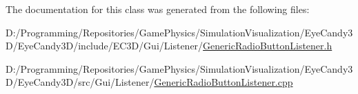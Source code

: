 The documentation for this class was generated from the following files\+:\begin{DoxyCompactItemize}
\item 
D\+:/\+Programming/\+Repositories/\+Game\+Physics/\+Simulation\+Visualization/\+Eye\+Candy3\+D/\+Eye\+Candy3\+D/include/\+E\+C3\+D/\+Gui/\+Listener/\mbox{\hyperlink{_generic_radio_button_listener_8h}{Generic\+Radio\+Button\+Listener.\+h}}\item 
D\+:/\+Programming/\+Repositories/\+Game\+Physics/\+Simulation\+Visualization/\+Eye\+Candy3\+D/\+Eye\+Candy3\+D/src/\+Gui/\+Listener/\mbox{\hyperlink{_generic_radio_button_listener_8cpp}{Generic\+Radio\+Button\+Listener.\+cpp}}\end{DoxyCompactItemize}
